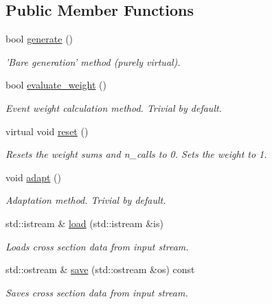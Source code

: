 \subsection*{Public Member Functions}
\begin{DoxyCompactItemize}
\item 
bool \hyperlink{a00437_afd6381ce5a2d653a8389c305460a6ecb}{generate} ()
\begin{DoxyCompactList}\small\item\em 'Bare generation' method (purely virtual). \end{DoxyCompactList}\item 
\hypertarget{a00437_a91db958bf7e0933a35fbf2cb8b539065}{bool \hyperlink{a00437_a91db958bf7e0933a35fbf2cb8b539065}{evaluate\-\_\-weight} ()}\label{a00437_a91db958bf7e0933a35fbf2cb8b539065}

\begin{DoxyCompactList}\small\item\em Event weight calculation method. Trivial by default. \end{DoxyCompactList}\item 
\hypertarget{a00437_a0fbd3a7065f08ca4b25e6e60c18141e3}{virtual void \hyperlink{a00437_a0fbd3a7065f08ca4b25e6e60c18141e3}{reset} ()}\label{a00437_a0fbd3a7065f08ca4b25e6e60c18141e3}

\begin{DoxyCompactList}\small\item\em Resets the weight sums and n\-\_\-calls to 0. Sets the weight to 1. \end{DoxyCompactList}\item 
\hypertarget{a00437_a6ab4ae7501d4ded1b484846b20d19e1c}{void \hyperlink{a00437_a6ab4ae7501d4ded1b484846b20d19e1c}{adapt} ()}\label{a00437_a6ab4ae7501d4ded1b484846b20d19e1c}

\begin{DoxyCompactList}\small\item\em Adaptation method. Trivial by default. \end{DoxyCompactList}\item 
\hypertarget{a00437_a999e307bc95279b4980ee6797af08cba}{std\-::istream \& \hyperlink{a00437_a999e307bc95279b4980ee6797af08cba}{load} (std\-::istream \&is)}\label{a00437_a999e307bc95279b4980ee6797af08cba}

\begin{DoxyCompactList}\small\item\em Loads cross section data from input stream. \end{DoxyCompactList}\item 
\hypertarget{a00437_ab36d39593ef09e2d0f597339cab95d03}{std\-::ostream \& \hyperlink{a00437_ab36d39593ef09e2d0f597339cab95d03}{save} (std\-::ostream \&os) const }\label{a00437_ab36d39593ef09e2d0f597339cab95d03}

\begin{DoxyCompactList}\small\item\em Saves cross section data from input stream. \end{DoxyCompactList}\end{DoxyCompactItemize}

